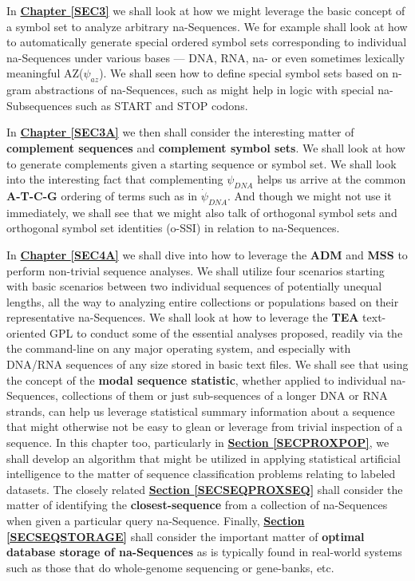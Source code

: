 \documentclass[a4paper, 18pt]{book} %
\begin{document}
In \textbf{\hyperref[SEC3]{Chapter \ref{SEC3}}} we shall look at how we might leverage the basic concept of a symbol set to analyze arbitrary na-Sequences. We for example shall look at how to automatically generate special ordered symbol sets corresponding to individual na-Sequences under various bases --- DNA, RNA, na- or even sometimes lexically meaningful AZ($\psi_{az}$). We shall seen how to define special symbol sets based on n-gram abstractions of na-Sequences, such as might help in logic with special na-Subsequences such as START and STOP codons.


In \textbf{\hyperref[SEC3A]{Chapter \ref{SEC3A}}} we then shall consider the interesting matter of \textbf{complement sequences} and \textbf{complement symbol sets}. We shall look at how to generate complements given a starting sequence or symbol set. We shall look into the interesting fact that complementing $\psi_{DNA}$ helps us arrive at the common \textbf{A-T-C-G} ordering of terms such as in $\dot{\psi}_{DNA}$. And though we might not use it immediately, we shall see that we might also talk of orthogonal symbol sets and orthogonal symbol set identities (o-SSI\cite{ossipaper}) in relation to na-Sequences.

In \textbf{\hyperref[SEC4A]{Chapter \ref{SEC4A}}} we shall dive into how to leverage the \textbf{ADM} and \textbf{MSS} to perform non-trivial sequence analyses. We shall utilize four scenarios starting with basic scenarios between two individual sequences of potentially unequal lengths, all the way to analyzing entire collections or populations based on their representative na-Sequences. We shall look at how to leverage the \textbf{TEA}\cite{Lutalo2024_taz}\cite{cli_tttt} text-oriented GPL to conduct some of the essential analyses proposed, readily via the the command-line on any major operating system, and especially with DNA/RNA sequences of any size stored in basic text files. We shall see that using the concept of the \textbf{modal sequence statistic}, whether applied to individual na-Sequences, collections of them or just sub-sequences of a longer DNA or RNA strands, can help us leverage statistical summary information about a sequence that might otherwise not be easy to glean or leverage from trivial inspection of a sequence. In this chapter too, particularly in \textbf{\hyperref[SECPROXPOP]{Section \ref{SECPROXPOP}}}, we shall develop an algorithm that might be utilized in applying statistical artificial intelligence to the matter of sequence classification problems relating to labeled datasets. The closely related \textbf{\hyperref[SECSEQPROXSEQ]{Section \ref{SECSEQPROXSEQ}}} shall consider the matter of identifying the \textbf{closest-sequence} from a collection of na-Sequences when given a particular query na-Sequence. Finally, \textbf{\hyperref[SECSEQSTORAGE]{Section \ref{SECSEQSTORAGE}}} shall consider the important matter of \textbf{optimal database storage of na-Sequences} as is typically found in real-world systems such as those that do whole-genome sequencing or gene-banks, etc. 
\end{document}
